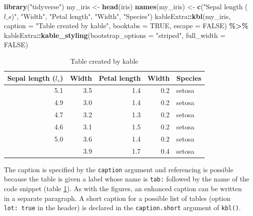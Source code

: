 \documentclass[
  12pt,
  american,
  a4paper,
  extrafontsizes,onecolumn,openright
  ]{memoir}
\newenvironment{Shaded}{\begin{snugshade}}{\end{snugshade}}
\newcommand{\AttributeTok}[1]{\textcolor[rgb]{0.13,0.29,0.53}{#1}}
\newcommand{\ConstantTok}[1]{\textcolor[rgb]{0.56,0.35,0.01}{#1}}
\newcommand{\FunctionTok}[1]{\textcolor[rgb]{0.13,0.29,0.53}{\textbf{#1}}}
\newcommand{\NormalTok}[1]{#1}
\newcommand{\OtherTok}[1]{\textcolor[rgb]{0.56,0.35,0.01}{#1}}
\newcommand{\SpecialCharTok}[1]{\textcolor[rgb]{0.81,0.36,0.00}{\textbf{#1}}}
\newcommand{\StringTok}[1]{\textcolor[rgb]{0.31,0.60,0.02}{#1}}
\begin{document}
\scriptsize

\begin{Shaded}
\begin{Highlighting}[]
\FunctionTok{library}\NormalTok{(}\StringTok{"tidyverse"}\NormalTok{)}
\NormalTok{my\_iris }\OtherTok{\textless{}{-}} \FunctionTok{head}\NormalTok{(iris)}
\FunctionTok{names}\NormalTok{(my\_iris) }\OtherTok{\textless{}{-}} \FunctionTok{c}\NormalTok{(}\StringTok{"Sepal length ($l\_s$)"}\NormalTok{, }\StringTok{"Width"}\NormalTok{, }\StringTok{"Petal length"}\NormalTok{,}
    \StringTok{"Width"}\NormalTok{, }\StringTok{"Species"}\NormalTok{)}
\NormalTok{kableExtra}\SpecialCharTok{::}\FunctionTok{kbl}\NormalTok{(my\_iris, }\AttributeTok{caption =} \StringTok{"Table created by kable"}\NormalTok{,}
    \AttributeTok{booktabs =} \ConstantTok{TRUE}\NormalTok{, }\AttributeTok{escape =} \ConstantTok{FALSE}\NormalTok{) }\SpecialCharTok{\%\textgreater{}\%}
\NormalTok{    kableExtra}\SpecialCharTok{::}\FunctionTok{kable\_styling}\NormalTok{(}\AttributeTok{bootstrap\_options =} \StringTok{"striped"}\NormalTok{,}
        \AttributeTok{full\_width =} \ConstantTok{FALSE}\NormalTok{)}
\end{Highlighting}
\end{Shaded}

\begin{table}
\centering
\caption{\label{tab:kable}Table created by kable}
\centering
\begin{tabular}[t]{rrrrl}
\toprule
Sepal length ($l_s$) & Width & Petal length & Width & Species\\
\midrule
5.1 & 3.5 & 1.4 & 0.2 & setosa\\
4.9 & 3.0 & 1.4 & 0.2 & setosa\\
4.7 & 3.2 & 1.3 & 0.2 & setosa\\
4.6 & 3.1 & 1.5 & 0.2 & setosa\\
5.0 & 3.6 & 1.4 & 0.2 & setosa\\
\addlinespace
5.4 & 3.9 & 1.7 & 0.4 & setosa\\
\bottomrule
\end{tabular}
\end{table}

\normalsize

The caption is specified by the \texttt{caption} argument and referencing is possible because the table is given a label whose name is \texttt{tab:} followed by the name of the code snippet (table \ref{tab:kable}).
As with the figures, an enhanced caption can be written in a separate paragraph.
A short caption for a possible list of tables (option \texttt{lot:\ true} in the header) is declared in the \texttt{caption.short} argument of \texttt{kbl()}.
\end{document}
